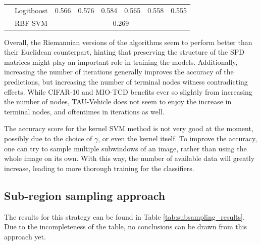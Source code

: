 \documentclass[12pt]{article}
\begin{document}
\begin{sloppypar}
\begin{table}[hbt!]
\begin{tabular}{lllllllll}
                                       & \multicolumn{2}{l}{Logitboost}                            & 0.566                           & 0.576                            & 0.584                            & 0.565                           & 0.558                            & 0.555                            \\
                                       & \multicolumn{2}{l}{RBF SVM}                               & \multicolumn{6}{c}{0.269}                                                                                                                                                                                     \\ \hline
\end{tabular}
\end{table}
\vspace{5mm}
\noindent
Overall, the Riemannian versions of the algorithms seem to perform better than their Euclidean counterpart, hinting that preserving the structure of the SPD matrices might play an important role in training the models. Additionally, increasing the number of iterations generally improves the accuracy of the predictions, but increasing the number of terminal nodes witness contradicting effects. While CIFAR-10 and MIO-TCD benefits ever so slightly from increasing the number of nodes, TAU-Vehicle does not seem to enjoy the increase in terminal nodes, and oftentimes in iterations as well.

\noindent
The accuracy score for the kernel SVM method is not very good at the moment, possibly due to the choice of $\gamma$, or even the kernel itself. To improve the accuracy, one can try to sample multiple subwindows of an image, rather than using the whole image on its own. With this way, the number of available data will greatly increase, leading to more thorough training for the classifiers.

\subsection{Sub-region sampling approach}
The results for this strategy can be found in Table \ref{tab:subsampling_results}. Due to the incompleteness of the table, no conclusions can be drawn from this approach yet.


\end{sloppypar}
\end{document}
